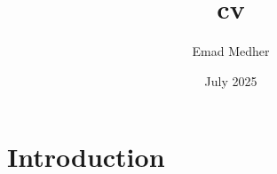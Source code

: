 \documentclass{article}
\title{cv}
\author{Emad Medher}
\date{July 2025}
\begin{document}
\maketitle

\section{Introduction}
\end{document}
